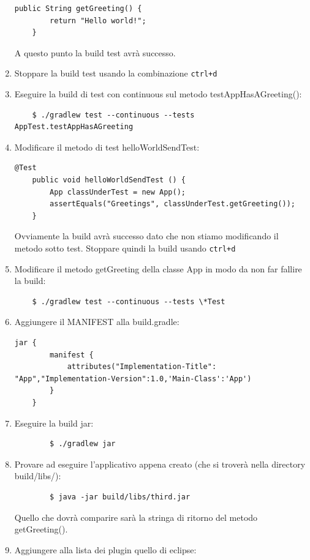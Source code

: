 \begin{enumerate}
    \begin{lstlisting}[frame=single]
    public String getGreeting() {
        return "Hello world!";
    }
    \end{lstlisting}
    A questo punto la build test avrà successo.
    \item Stoppare la build test usando la combinazione \texttt{ctrl+d}
    \item Eseguire la build di test con continuous sul metodo testAppHasAGreeting():
    \begin{verbatim}
    $ ./gradlew test --continuous --tests AppTest.testAppHasAGreeting \end{verbatim}
    \item Modificare il metodo di test helloWorldSendTest:
    \begin{lstlisting}[frame=single]
    @Test 
    public void helloWorldSendTest () {
	    App classUnderTest = new App();
	    assertEquals("Greetings", classUnderTest.getGreeting());
    }
    \end{lstlisting}
    Ovviamente la build avrà successo dato che non stiamo modificando il metodo sotto test. Stoppare quindi la build usando \texttt{ctrl+d}
    \item Modificare il metodo getGreeting della classe App in modo da non far fallire la build:
    \begin{verbatim}
    $ ./gradlew test --continuous --tests \*Test\end{verbatim}
    \item Aggiungere il MANIFEST alla build.gradle:
    \begin{lstlisting}[frame=single]
    jar {
        manifest {
            attributes("Implementation-Title": "App","Implementation-Version":1.0,'Main-Class':'App')
        }
    }
    \end{lstlisting}
    \item Eseguire la build jar:
    \begin{verbatim}
        $ ./gradlew jar\end{verbatim}
    \item Provare ad eseguire l'applicativo appena creato (che si troverà nella directory build/libs/):
    \begin{verbatim}
        $ java -jar build/libs/third.jar \end{verbatim}
    Quello che dovrà comparire sarà la stringa di ritorno del metodo getGreeting().
    \item Aggiungere alla lista dei plugin quello di eclipse:
    \begin{lstlisting}[frame=single]

\end{lstlisting}
\end{enumerate}
